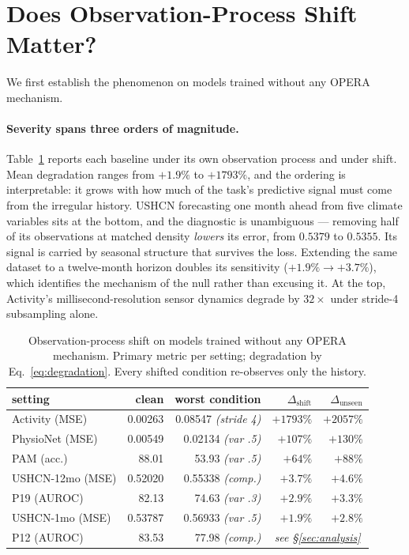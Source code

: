 
\section{Does Observation-Process Shift Matter?}
\label{sec:phenomenon}
We first establish the phenomenon on models trained without any OPERA mechanism.

\paragraph{Severity spans three orders of magnitude.}
Table~\ref{tab:phenomenon} reports each baseline under its own observation process and under shift. Mean
degradation ranges from $+1.9\%$ to $+1793\%$, and the ordering is interpretable: it grows with how much of the
task's predictive signal must come from the irregular history. USHCN forecasting one month ahead from five
climate variables sits at the bottom, and the diagnostic is unambiguous --- removing half of its observations at
matched density \emph{lowers} its error, from $0.5379$ to $0.5355$. Its signal is carried by seasonal structure
that survives the loss. Extending the same dataset to a twelve-month horizon doubles its sensitivity
($+1.9\%\to+3.7\%$), which identifies the mechanism of the null rather than excusing it. At the top, Activity's
millisecond-resolution sensor dynamics degrade by $32\times$ under stride-4 subsampling alone.

\begin{table}[t]
\caption{Observation-process shift on models trained without any OPERA mechanism\prelim. Primary metric per
setting; degradation by Eq.~\ref{eq:degradation}. Every shifted condition re-observes only the history.}
\label{tab:phenomenon}
\small
\begin{tabular}{lrrrr}
\toprule
setting & clean & worst condition & $\Delta_{\mathrm{shift}}$ & $\Delta_{\mathrm{unseen}}$ \\
\midrule
Activity (MSE) & 0.00263 & 0.08547 \textit{(stride 4)} & $+1793\%$ & $+2057\%$ \\
PhysioNet (MSE) & 0.00549 & 0.02134 \textit{(var .5)} & $+107\%$ & $+130\%$ \\
PAM (acc.) & 88.01 & 53.93 \textit{(var .5)} & $+64\%$ & $+88\%$ \\
USHCN-12mo (MSE) & 0.52020 & 0.55338 \textit{(comp.)} & $+3.7\%$ & $+4.6\%$ \\
P19 (AUROC) & 82.13 & 74.63 \textit{(var .3)} & $+2.9\%$ & $+3.3\%$ \\
USHCN-1mo (MSE) & 0.53787 & 0.56933 \textit{(var .5)} & $+1.9\%$ & $+2.8\%$ \\
P12 (AUROC) & 83.53 & 77.98 \textit{(comp.)} & \multicolumn{2}{c}{\textit{see \S\ref{sec:analysis}}} \\
\bottomrule
\end{tabular}
\end{table}

